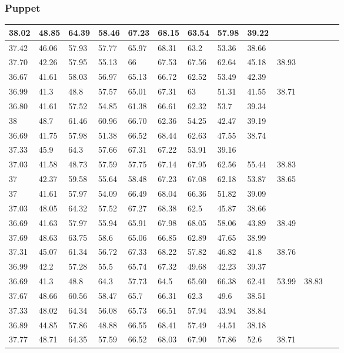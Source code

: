 \subsubsection{Puppet}
\begin{tabular}{ | l | l | l | l | l | l | l | l | l | l | l | l }
\hline
	38.02 & 48.85 & 64.39 & 58.46 & 67.23 & 68.15 & 63.54 & 57.98 & 39.22 & &    \\ \hline
	37.42 & 46.06 & 57.93 & 57.77 & 65.97 & 68.31 & 63.2 & 53.36 & 38.66 &  & \\ \hline
	37.70 & 42.26 & 57.95 & 55.13 & 66 & 67.53 & 67.56 & 62.64 & 45.18 & 38.93 &   \\ \hline
	36.67 & 41.61 & 58.03 & 56.97 & 65.13 & 66.72 & 62.52 & 53.49 & 42.39 & &  \\ \hline
	36.99 & 41.3 & 48.8 & 57.57 & 65.01 & 67.31 & 63 & 51.31 & 41.55 & 38.71 & \\ \hline
	36.80 & 41.61 & 57.52 & 54.85 & 61.38 & 66.61 & 62.32 & 53.7 & 39.34 &  & \\ \hline
	38 & 48.7 & 61.46 & 60.96 & 66.70 & 62.36 & 54.25 & 42.47 & 39.19 & & \\ \hline
	36.69 & 41.75 & 57.98 & 51.38 & 66.52 & 68.44 & 62.63 & 47.55 & 38.74 & & \\ \hline
	37.33 & 45.9 & 64.3 & 57.66 & 67.31 & 67.22 & 53.91 & 39.16 &  & \  & \  & \  \\ \hline
	37.03 & 41.58 & 48.73 & 57.59 & 57.75 & 67.14 & 67.95 & 62.56 & 55.44 & 38.83 &    \\ \hline
	37 & 42.37 & 59.58 & 55.64 & 58.48 & 67.23 & 67.08 & 62.18 & 53.87 & 38.65 &   \\ \hline
	37 & 41.61 & 57.97 & 54.09 & 66.49 & 68.04 & 66.36 & 51.82 & 39.09 &  &  \\ \hline
	37.03 & 48.05 & 64.32 & 57.52 & 67.27 & 68.38 & 62.5 & 45.87 & 38.66 &  \\ \hline
	36.69 & 41.63 & 57.97 & 55.94 & 65.91 & 67.98 & 68.05 & 58.06 & 43.89 & 38.49 &  \\ \hline
	37.69 & 48.63 & 63.75 & 58.6 & 65.06 & 66.85 & 62.89 & 47.65 & 38.99 &    \\ \hline
	37.31 & 45.07 & 61.34 & 56.72 & 67.33 & 68.22 & 57.82 & 46.82 & 41.8 & 38.76 &    \\ \hline
	36.99 & 42.2 & 57.28 & 55.5 & 65.74 & 67.32 & 49.68 & 42.23 & 39.37 &  &   \\ \hline
	36.69 & 41.3 & 48.8 & 64.3 & 57.73 & 64.5 & 65.60 & 66.38 & 62.41 & 53.99 & 38.83 &  \\ \hline
	37.67 & 48.66 & 60.56 & 58.47 & 65.7 & 66.31 & 62.3 & 49.6 & 38.51 &  &  \\ \hline
	37.33 & 48.02 & 64.34 & 56.08 & 65.73 & 66.51 & 57.94 & 43.94 & 38.84 &  &    \\ \hline
	36.89 & 44.85 & 57.86 & 48.88 & 66.55 & 68.41 & 57.49 & 44.51 & 38.18 & &     \\ \hline
	37.77 & 48.71 & 64.35 & 57.59 & 66.52 & 68.03 & 67.90 & 57.86 & 52.6 & 38.71 &   \\ \hline	
\end{tabular}

